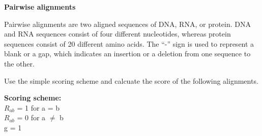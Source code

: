 \documentclass[12pt, answers]{exam}
\begin{document}
\begin{questions}

\question \textbf{Pairwise alignments}
  
Pairwise alignments are two aligned sequences of DNA, RNA, or protein. DNA and RNA sequences consist of four different nucleotides, whereas protein sequences consist of 20 different amino acids. The “-” sign is used to represent a blank or a gap, which indicates an insertion or a deletion from one sequence to the other.

Use the simple scoring scheme and calcuate the score of the following alignments.

\textbf{Scoring scheme: }\\
\null \quad $R_{ab}$ = 1 for a = b \\ 
\null \quad $R_{ab}$ = 0 for a $\neq$ b \\ 
\null \quad g = 1  


\end{questions}
\end{document}
